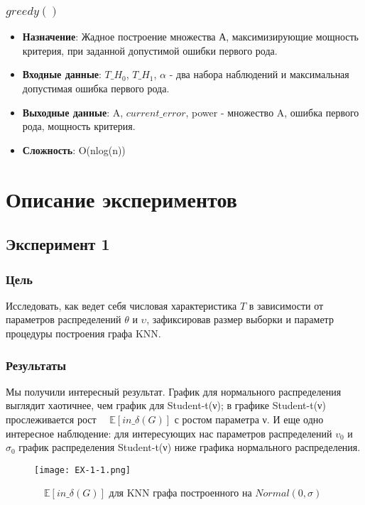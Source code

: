\documentclass[a4paper, 12pt]{article}
\begin{document}
\subsubsection{$greedy()$}
\begin{itemize}
    \item \textbf{Назначение}: Жадное построение множества А, максимизирующие мощность критерия, при заданной допустимой ошибки первого рода.
    \item \textbf{Входные данные}: $T\_H_0$, $T\_H_1$, $\alpha$ - два набора наблюдений и максимальная допустимая ошибка первого рода.
    \item \textbf{Выходные данные}: A, $current\_error$, power - множество A, ошибка первого рода, мощность критерия. 
    \item \textbf{Сложность}: O(nlog(n))
\end{itemize}

\section{Описание экспериментов}
\subsection{Эксперимент 1}
\subsubsection{Цель}
Исследовать, как ведет себя числовая характеристика $T$ в зависимости
от параметров распределений $θ$ и $υ$, зафиксировав размер выборки и
параметр процедуры построения графа KNN.\\

\subsubsection{Результаты}

Мы получили интересный результат. График для нормального распределения выглядит хаотичнее, чем график для Student-t(ν); в графике Student-t(ν) прослеживается рост $\quad \mathbb{E}[in\_\delta(G)]$ с ростом параметра ν. И еще одно интересное наблюдение: для интересующих нас параметров распределений $v_0$ и $σ_0$ график распределения Student-t(ν) ниже графика нормального распределения.\\

\begin{figure}[H]
    \centering
    \texttt{[image: EX-1-1.png]}
    \caption{$\quad \mathbb{E}[in\_\delta(G)]$ для KNN графа построенного на $Normal(0,\sigma)$}
    \label{fig:uml}
\end{figure}
\end{document}
